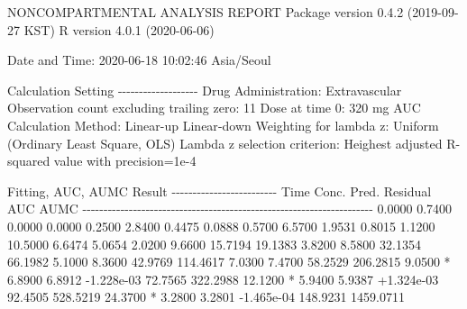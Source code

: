 \documentclass[
  10pt,
]{krantz}
\makeatletter
\newenvironment{Shaded}{\begin{snugshade}}{\end{snugshade}}
\newcommand{\ExtensionTok}[1]{#1}
\newcommand{\NormalTok}[1]{#1}
\newenvironment{kframe}{%
\medskip{}
\setlength{\fboxsep}{.8em}
 \def\at@end@of@kframe{}%
 \ifinner\ifhmode%
  \def\at@end@of@kframe{\end{minipage}}%
  \begin{minipage}{\columnwidth}%
 \fi\fi%
 \def\FrameCommand##1{\hskip\@totalleftmargin \hskip-\fboxsep
 \colorbox{shadecolor}{##1}\hskip-\fboxsep
     \hskip-\linewidth \hskip-\@totalleftmargin \hskip\columnwidth}%
 \MakeFramed {\advance\hsize-\width
   \@totalleftmargin\z@ \linewidth\hsize
   \@setminipage}}%
 {\par\unskip\endMakeFramed%
 \at@end@of@kframe}
\renewenvironment{Shaded}{\begin{kframe}}{\end{kframe}}
\makeatother
\begin{document}
\begin{Shaded}
\begin{Highlighting}[]
                        \ExtensionTok{NONCOMPARTMENTAL}\NormalTok{ ANALYSIS REPORT}
                       \ExtensionTok{Package}\NormalTok{ version 0.4.2 (2019{-}09{-}27 KST)}
                          \ExtensionTok{R}\NormalTok{ version 4.0.1 (2020{-}06{-}06)}

\ExtensionTok{Date}\NormalTok{ and Time: 2020{-}06{-}18 10:02:46 Asia/Seoul}

\ExtensionTok{Calculation}\NormalTok{ Setting}
\ExtensionTok{{-}{-}{-}{-}{-}{-}{-}{-}{-}{-}{-}{-}{-}{-}{-}{-}{-}{-}{-}}
\ExtensionTok{Drug}\NormalTok{ Administration: Extravascular}
\ExtensionTok{Observation}\NormalTok{ count excluding trailing zero: 11}
\ExtensionTok{Dose}\NormalTok{ at time 0: 320 mg}
\ExtensionTok{AUC}\NormalTok{ Calculation Method: Linear{-}up Linear{-}down}
\ExtensionTok{Weighting}\NormalTok{ for lambda z: Uniform (Ordinary Least Square, OLS)}
\ExtensionTok{Lambda}\NormalTok{ z selection criterion: Heighest adjusted R{-}squared value with precision=1e{-}4}


\ExtensionTok{Fitting}\NormalTok{, AUC, AUMC Result}
\ExtensionTok{{-}{-}{-}{-}{-}{-}{-}{-}{-}{-}{-}{-}{-}{-}{-}{-}{-}{-}{-}{-}{-}{-}{-}{-}{-}}
      \ExtensionTok{Time}\NormalTok{         Conc.      Pred.   Residual       AUC       AUMC}
\ExtensionTok{{-}{-}{-}{-}{-}{-}{-}{-}{-}{-}{-}{-}{-}{-}{-}{-}{-}{-}{-}{-}{-}{-}{-}{-}{-}{-}{-}{-}{-}{-}{-}{-}{-}{-}{-}{-}{-}{-}{-}{-}{-}{-}{-}{-}{-}{-}{-}{-}{-}{-}{-}{-}{-}{-}{-}{-}{-}{-}{-}{-}{-}{-}{-}{-}{-}{-}{-}{-}{-}}
     \ExtensionTok{0.0000}\NormalTok{       0.7400                           0.0000     0.0000}
     \ExtensionTok{0.2500}\NormalTok{       2.8400                           0.4475     0.0888}
     \ExtensionTok{0.5700}\NormalTok{       6.5700                           1.9531     0.8015}
     \ExtensionTok{1.1200}\NormalTok{      10.5000                           6.6474     5.0654}
     \ExtensionTok{2.0200}\NormalTok{       9.6600                          15.7194    19.1383}
     \ExtensionTok{3.8200}\NormalTok{       8.5800                          32.1354    66.1982}
     \ExtensionTok{5.1000}\NormalTok{       8.3600                          42.9769   114.4617}
     \ExtensionTok{7.0300}\NormalTok{       7.4700                          58.2529   206.2815}
     \ExtensionTok{9.0500}\NormalTok{ *     6.8900     6.8912 {-}1.228e{-}03    72.7565   322.2988}
    \ExtensionTok{12.1200}\NormalTok{ *     5.9400     5.9387 +1.324e{-}03    92.4505   528.5219}
    \ExtensionTok{24.3700}\NormalTok{ *     3.2800     3.2801 {-}1.465e{-}04   148.9231  1459.0711}


\end{Highlighting}
\end{Shaded}
\end{document}
